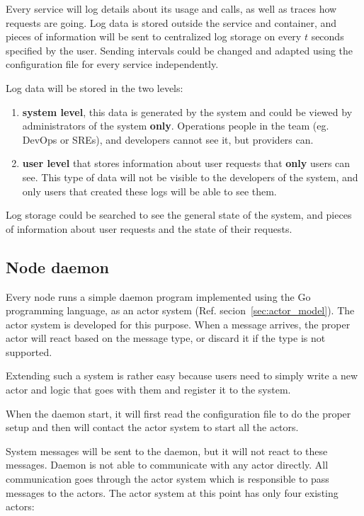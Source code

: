 Every service will log details about its usage and calls, as well as traces how requests are going. Log data is stored outside the service and container, and pieces of information will be sent to centralized log storage on every $t$ seconds specified by the user. Sending intervals could be changed and adapted using the configuration file for every service independently.

Log data will be stored in the two levels:

\begin{enumerate}[start=1,label={(\bfseries \arabic*)}]
	\item \textbf{system level}, this data is generated by the system and could be viewed by administrators of the system \textbf{only}. Operations people in the team (eg. DevOps or SREs), and developers cannot see it, but providers can.
	\item \textbf{user level} that stores information about user requests that \textbf{only} users can see. This type of data will not be visible to the developers of the system, and only users that created these logs will be able to see them.
\end{enumerate}

\noindent
Log storage could be searched to see the general state of the system, and pieces of information about user requests and the state of their requests.
%
%
\subsection{Node daemon}\label{sec:node_daemon}
%
Every node runs a simple daemon program implemented using the Go programming language, as an actor system (Ref. secion~\ref{sec:actor_model}). The actor system is developed for this purpose. When a message arrives, the proper actor will react based on the message type, or discard it if the type is not supported. 

Extending such a system is rather easy because users need to simply write a new actor and logic that goes with them and register it to the system.

When the daemon start, it will first read the configuration file to do the proper setup and then will contact the actor system to start all the actors. 

System messages will be sent to the daemon, but it will not react to these messages. Daemon is not able to communicate with any actor directly. All communication goes through the actor system which is responsible to pass messages to the actors. The actor system at this point has only four existing actors:

